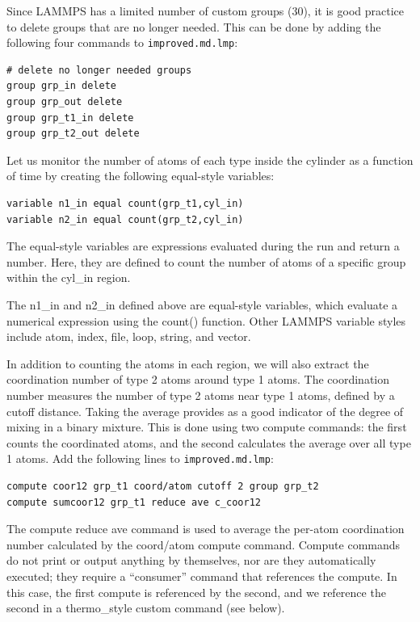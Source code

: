 \documentclass[9pt,tutorial]{livecoms}
\newcommand{\lmpcmd}[1]{\colorbox{listing}{\textcolor{command}{\small{#1}}}} %
\newcommand{\flecmd}[1]{\textcolor{command}{\texttt{#1}}} %
\begin{document}
Since LAMMPS has a limited number of custom groups (30), it is good practice
to delete groups that are no longer needed.  This can be done by adding the
following four commands to \flecmd{improved.md.lmp}:
\begin{lstlisting}
# delete no longer needed groups
group grp_in delete
group grp_out delete
group grp_t1_in delete
group grp_t2_out delete
\end{lstlisting}

Let us monitor the number of atoms of each type inside the cylinder as a
function of time by creating the following equal-style variables:
\begin{lstlisting}
variable n1_in equal count(grp_t1,cyl_in)
variable n2_in equal count(grp_t2,cyl_in)
\end{lstlisting}
The equal-style \lmpcmd{variables} are expressions evaluated
during the run and return a number.  Here, they are defined to count
the number of atoms of a specific group within the \lmpcmd{cyl\_in} region.

\begin{note}
{\color{blue}The \lmpcmd{n1\_in} and \lmpcmd{n2\_in} defined above are
equal-style variables, which evaluate a numerical expression using the
\lmpcmd{count()} function.  Other LAMMPS variable styles include
atom, index, file, loop, string, and vector.}
\end{note}

In addition to counting the atoms in each region, we will also extract
the coordination number of type 2 atoms around type 1 atoms.  The
coordination number measures the number of type 2 atoms near
type 1 atoms, defined by a cutoff distance.  Taking the average provides
as a good indicator of the degree of mixing in a binary mixture.  This
is done using two \lmpcmd{compute} commands:  the first counts the
coordinated atoms, and the second calculates the average over all type 1
atoms.  Add the following lines to \flecmd{improved.md.lmp}:
\begin{lstlisting}
compute coor12 grp_t1 coord/atom cutoff 2 group grp_t2
compute sumcoor12 grp_t1 reduce ave c_coor12
\end{lstlisting}
The \lmpcmd{compute reduce ave} command is used to average the per-atom
coordination number calculated by the \lmpcmd{coord/atom}
compute command.  {\color{blue}Compute commands do not print or output
anything by themselves, nor are they automatically executed;} they
require a ``consumer'' command that references the compute.  In this case, the
first compute is referenced by the second, and we reference the second
in a \lmpcmd{thermo\_style custom} command (see below).
\end{document}
